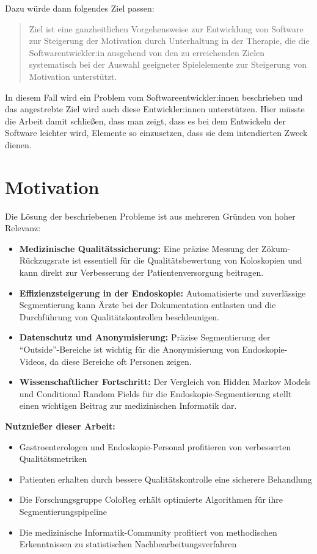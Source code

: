 Dazu würde dann folgendes Ziel passen:
\blockquote{Ziel ist eine ganzheitlichen Vorgehensweise zur Entwicklung von Software zur Steigerung der Motivation durch Unterhaltung in der Therapie, die die Softwarentwickler:in ausgehend von den zu erreichenden Zielen systematisch bei der Auswahl geeigneter Spielelemente zur Steigerung von Motivation unterstützt.}
In diesem Fall wird ein Problem vom Softwareentwickler:innen beschrieben und das angestrebte Ziel wird auch diese Entwickler:innen unterstützen.
Hier müsste die Arbeit damit schließen, dass man zeigt, dass es bei dem Entwickeln der Software leichter wird, Elemente so einzusetzen, dass sie dem intendierten Zweck dienen.

\section{Motivation}

Die Lösung der beschriebenen Probleme ist aus mehreren Gründen von hoher Relevanz:

\begin{itemize}
\item \textbf{Medizinische Qualitätssicherung:} Eine präzise Messung der Zökum-Rückzugsrate ist essentiell für die Qualitätsbewertung von Koloskopien und kann direkt zur Verbesserung der Patientenversorgung beitragen.

\item \textbf{Effizienzsteigerung in der Endoskopie:} Automatisierte und zuverlässige Segmentierung kann Ärzte bei der Dokumentation entlasten und die Durchführung von Qualitätskontrollen beschleunigen.

\item \textbf{Datenschutz und Anonymisierung:} Präzise Segmentierung der \enquote{Outside}-Bereiche ist wichtig für die Anonymisierung von Endoskopie-Videos, da diese Bereiche oft Personen zeigen.

\item \textbf{Wissenschaftlicher Fortschritt:} Der Vergleich von Hidden Markov Models und Conditional Random Fields für die Endoskopie-Segmentierung stellt einen wichtigen Beitrag zur medizinischen Informatik dar.
\end{itemize}

\textbf{Nutznießer dieser Arbeit:}
\begin{itemize}
\item Gastroenterologen und Endoskopie-Personal profitieren von verbesserten Qualitätsmetriken
\item Patienten erhalten durch bessere Qualitätskontrolle eine sicherere Behandlung  
\item Die Forschungsgruppe ColoReg erhält optimierte Algorithmen für ihre Segmentierungspipeline
\item Die medizinische Informatik-Community profitiert von methodischen Erkenntnissen zu statistischen Nachbearbeitungsverfahren
\end{itemize}

